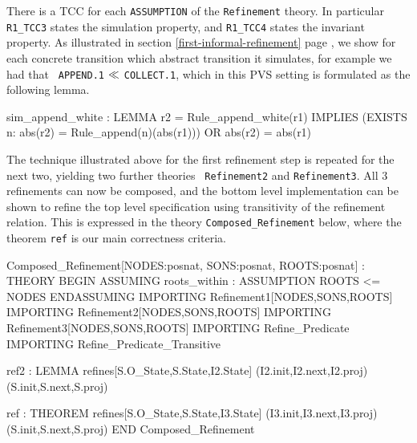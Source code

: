 There is  a TCC for  each {\tt  ASSUMPTION}   of the {\tt  Refinement}
theory.  In particular {\tt  R1\_TCC3} states the simulation property,
and {\tt R1\_TCC4} states  the invariant property.  As illustrated  in
section                \ref{first-informal-refinement}            page
\pageref{append-refines-collect}, we show for each concrete transition
which abstract transition it simulates,  for example we had that  {\tt
  APPEND.1} $\ll$ {\tt COLLECT.1},  which in this PVS  setting is
formulated as the following lemma.

\begin{smallsession}
  sim_append_white : LEMMA
    r2 = Rule_append_white(r1) IMPLIES
      (EXISTS n: abs(r2) = Rule_append(n)(abs(r1))) OR abs(r2) = abs(r1)
\end{smallsession}
\label{pvs-append-refines-collect}

The   technique illustrated above   for  the first refinement step  is
repeated  for the   next two,   yielding   two further  theories  {\tt
  Refinement2}  and {\tt Refinement3}\@.  All 3  refinements  can now be
composed,  and the bottom level implementation  can be shown to refine
the  top  level  specification  using transitivity  of  the refinement
relation.  This is expressed  in the theory {\tt Composed\_Refinement}
below, where the theorem {\tt ref} is our main correctness criteria.

\begin{smallsession}
Composed_Refinement[NODES:posnat, SONS:posnat, ROOTS:posnat] : THEORY
BEGIN
  ASSUMING
    roots_within : ASSUMPTION ROOTS <= NODES
  ENDASSUMING
  IMPORTING Refinement1[NODES,SONS,ROOTS]
  IMPORTING Refinement2[NODES,SONS,ROOTS]
  IMPORTING Refinement3[NODES,SONS,ROOTS]
  IMPORTING Refine_Predicate
  IMPORTING Refine_Predicate_Transitive

  ref2 : LEMMA 
    refines[S.O_State,S.State,I2.State]
      (I2.init,I2.next,I2.proj)(S.init,S.next,S.proj)

  ref : THEOREM 
    refines[S.O_State,S.State,I3.State]
      (I3.init,I3.next,I3.proj)(S.init,S.next,S.proj)
END Composed_Refinement
\end{smallsession}
\label{composing-refinements}


